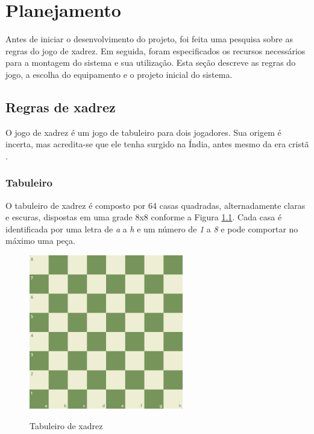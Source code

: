 \chapter[Planejamento]{Planejamento}
\label{cap:planejamento}

Antes de iniciar o desenvolvimento do projeto, foi feita uma pesquisa sobre as regras do jogo de xadrez.
Em seguida, foram especificados os recursos necessários para a montagem do sistema e sua utilização.
Esta seção descreve as regras do jogo, a escolha do equipamento e o projeto inicial do sistema.

\section[Regras de xadrez]{Regras de xadrez}
\label{sec:xadrezRegras}

O jogo de xadrez é um jogo de tabuleiro para dois jogadores.
Sua origem é incerta, mas acredita-se que ele tenha surgido na Índia, antes mesmo da era cristã \cite{xadrez_historia}.

\subsection[Tabuleiro]{Tabuleiro}
\label{sub:xadrezTabuleiro}

O tabuleiro de xadrez é composto por 64 casas quadradas, alternadamente claras e escuras, dispostas em uma grade 8x8 conforme a Figura \ref{fig:xadrezTabuleiro}.
Cada casa é identificada por uma letra de \textit{a} a \textit{h} e um número de \textit{1} a \textit{8}
e pode comportar no máximo uma peça.

\begin{figure}[H]
    \centering
    \caption{Tabuleiro de xadrez}
    \includegraphics[keepaspectratio=true, width=0.6\textwidth]
    	{img/xadrez-tabuleiro.png}
    \label{fig:xadrezTabuleiro}
\end{figure}

